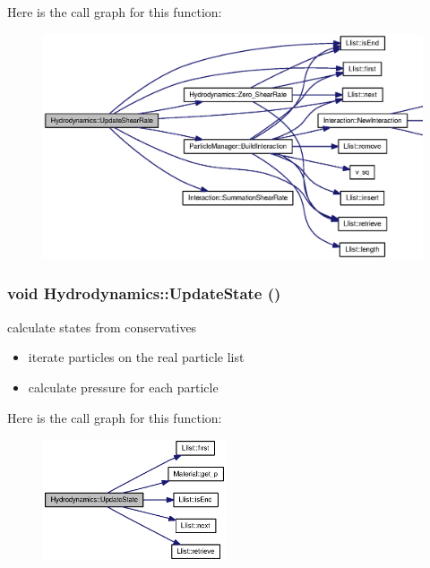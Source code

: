 Here is the call graph for this function:\nopagebreak
\begin{figure}[H]
\begin{center}
\leavevmode
\includegraphics[width=359pt]{classHydrodynamics_7ae4f1005699f13414ec6c487bac0ee0_cgraph}
\end{center}
\end{figure}
\hypertarget{classHydrodynamics_1698dbe8ecc0e730319de5d7eca7a891}{
\subsubsection[{UpdateState}]{\setlength{\rightskip}{0pt plus 5cm}void Hydrodynamics::UpdateState ()}}
\label{classHydrodynamics_1698dbe8ecc0e730319de5d7eca7a891}


calculate states from conservatives 



\begin{itemize}
\item iterate particles on the real particle list\end{itemize}


\begin{itemize}
\item calculate pressure for each particle \end{itemize}


Here is the call graph for this function:\nopagebreak
\begin{figure}[H]
\begin{center}
\leavevmode
\includegraphics[width=153pt]{classHydrodynamics_1698dbe8ecc0e730319de5d7eca7a891_cgraph}
\end{center}
\end{figure}


